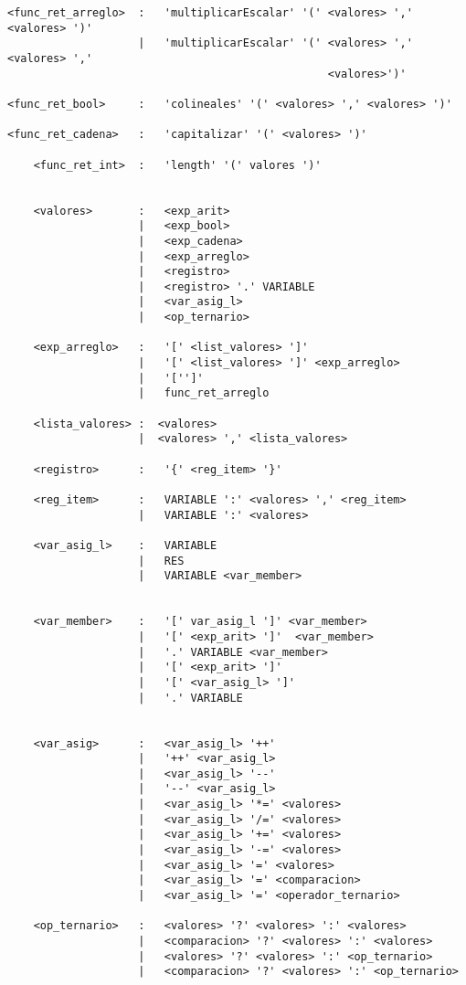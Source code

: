 \begin{verbatim}
<func_ret_arreglo>  :   'multiplicarEscalar' '(' <valores> ',' <valores> ')'
                    |   'multiplicarEscalar' '(' <valores> ',' <valores> ',' 
                                                 <valores>')'
                    
<func_ret_bool>     :   'colineales' '(' <valores> ',' <valores> ')'

<func_ret_cadena>   :   'capitalizar' '(' <valores> ')'

    <func_ret_int>  :   'length' '(' valores ')'


    <valores>       :   <exp_arit>
                    |   <exp_bool>
                    |   <exp_cadena>
                    |   <exp_arreglo>
                    |   <registro>
                    |   <registro> '.' VARIABLE
                    |   <var_asig_l>
                    |   <op_ternario>

    <exp_arreglo>   :   '[' <list_valores> ']'
                    |   '[' <list_valores> ']' <exp_arreglo>
                    |   '['']'
                    |   func_ret_arreglo

    <lista_valores> :  <valores>
                    |  <valores> ',' <lista_valores>

    <registro>      :   '{' <reg_item> '}'

    <reg_item>      :   VARIABLE ':' <valores> ',' <reg_item>
                    |   VARIABLE ':' <valores> 

    <var_asig_l>    :   VARIABLE
                    |   RES
                    |   VARIABLE <var_member>


    <var_member>    :   '[' var_asig_l ']' <var_member>
                    |   '[' <exp_arit> ']'  <var_member>
                    |   '.' VARIABLE <var_member>
                    |   '[' <exp_arit> ']' 
                    |   '[' <var_asig_l> ']' 
                    |   '.' VARIABLE 


    <var_asig>      :   <var_asig_l> '++'
                    |   '++' <var_asig_l>
                    |   <var_asig_l> '--'
                    |   '--' <var_asig_l>
                    |   <var_asig_l> '*=' <valores>
                    |   <var_asig_l> '/=' <valores>
                    |   <var_asig_l> '+=' <valores>
                    |   <var_asig_l> '-=' <valores>
                    |   <var_asig_l> '=' <valores>
                    |   <var_asig_l> '=' <comparacion>
                    |   <var_asig_l> '=' <operador_ternario>

    <op_ternario>   :   <valores> '?' <valores> ':' <valores>
                    |   <comparacion> '?' <valores> ':' <valores>
                    |   <valores> '?' <valores> ':' <op_ternario>
                    |   <comparacion> '?' <valores> ':' <op_ternario> 
                

\end{verbatim}
